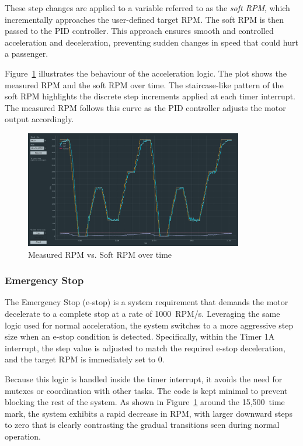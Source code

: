 \documentclass[a4paper, 11pt, titlepage]{article}
\begin{document}
These step changes are applied to a variable referred to as the \textit{soft RPM}, which incrementally approaches the user-defined target RPM. The soft RPM is then passed to the PID controller. This approach ensures smooth and controlled acceleration and deceleration, preventing sudden changes in speed that could hurt a passenger.

Figure~\ref{fig:rpm_acceleration} illustrates the behaviour of the acceleration logic. The plot shows the measured RPM and the soft RPM over time. The staircase-like pattern of the soft RPM highlights the discrete step increments applied at each timer interrupt. The measured RPM follows this curve as the PID controller adjusts the motor output accordingly.

\begin{figure}[h!]
    \centering
    \includegraphics[width=0.85\textwidth]{images/accel.png}
    \caption{Measured RPM vs. Soft RPM over time}
    \label{fig:rpm_acceleration}
\end{figure}
\subsubsection{Emergency Stop}
The Emergency Stop (e-stop) is a system requirement that demands the motor decelerate to a complete stop at a rate of 1000~RPM/s. Leveraging the same logic used for normal acceleration, the system switches to a more aggressive step size when an e-stop condition is detected. Specifically, within the Timer 1A interrupt, the step value is adjusted to match the required e-stop deceleration, and the target RPM is immediately set to 0.

Because this logic is handled inside the timer interrupt, it avoids the need for mutexes or coordination with other tasks. The code is kept minimal to prevent blocking the rest of the system. As shown in Figure~\ref{fig:rpm_acceleration} around the 15,500~time mark, the system exhibits a rapid decrease in RPM, with larger downward steps to zero that is clearly contrasting the gradual transitions seen during normal operation.
\end{document}
